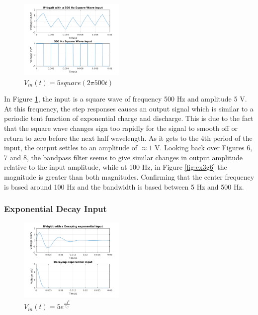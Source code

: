 \documentclass[11pt,a4paper]{article}
\begin{document}
\begin{figure}
    \vspace{-5mm}
  		\includegraphics[width=0.45\textwidth]{Ex3_Figs/500Squ1.png}
	\vspace{-3mm}
  	\caption{$V_{in}(t)= 5square(2 \pi 500t)$}
  	\label{fig:ex3g7}
\end{figure}

\vspace{5mm}In Figure \ref{fig:ex3g7}, the input is a square wave of frequency 500 Hz and amplitude 5 V. At this frequency, the step responses causes an output signal which is similar to a periodic tent function of exponential charge and discharge. This is due to the fact that the square wave changes sign too rapidly for the signal to smooth off or return to zero before the next half wavelength. As it gets to the 4th period of the input, the output settles to an amplitude of $\approx 1$ V. Looking back over Figures 6, 7 and 8, the bandpass filter seems to give similar changes in output amplitude relative to the input amplitude, while at 100 Hz, in Figure \ref{fig:ex3g6} the magnitude is greater than both magnitudes. Confirming that the center frequency is based around 100 Hz and the bandwidth is based between 5 Hz and 500 Hz.

\subsubsection{Exponential Decay Input}

\begin{figure}
    \vspace{-23mm}
  		\includegraphics[width=0.45\textwidth]{Ex3_Figs/DecExp.png}
	\vspace{-3mm}
  	\caption{$V_{in}(t)= 5e^{\frac{-t^2}{\tau_C}}$}
  	\label{fig:ex3g8}
\end{figure}
\end{document}
